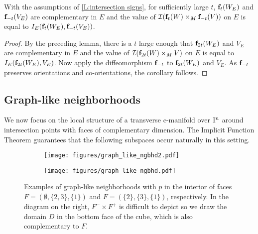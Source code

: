 \begin{corollary}\label{C:intersection signs}
	With the assumptions of \cref{L:intersection signs}, for sufficiently large $t$, $\mathbf{f}_t(W_E)$ and $\mathbf{f}_{-t}(V_E)$ are complementary in $E$ and the value of $\mathcal{I}(\mathbf{f}_t(W) \times_M \mathbf{f}_{-t}(V))$ on $E$ is equal to $I_E(\mathbf{f}_t(W_E), \mathbf{f}_{-t}(V_E))$.
\end{corollary}

\begin{proof}
	By the preceding lemma, there is a $t$ large enough that $\mathbf{f}_{2t}(W_E)$ and $V_E$ are complementary in $E$ and the value of $\mathcal{I}(\mathbf{f}_{2t}(W) \times_M V)$ on $E$ is equal to $I_E(\mathbf{f}_{2t}(W_E), V_E)$.
	Now apply the diffeomorphism $\mathbf{f}_{-t}$ to $\mathbf{f}_{2t}(W_E)$ and $V_E$.
	As $\mathbf{f}_{-t}$ preserves orientations and co-orientations, the corollary follows.
\end{proof}

\subsection{Graph-like neighborhoods}

We now focus on the local structure of a transverse c-manifold over $\mathbb{I}^n$ around intersection points with faces of complementary dimension.
The Implicit Function Theorem guarantees that the following subspaces occur naturally in this setting.

\begin{figure}[!h]
	\centering
	\begin{subfigure}{.32\textwidth}
		\texttt{[image: figures/graph\_like\_ngbhd2.pdf]}
		\hfill
	\end{subfigure}
	\begin{subfigure}{.32\textwidth}
		\hfill
		\texttt{[image: figures/graph\_like\_ngbhd.pdf]}
	\end{subfigure}
	\caption{Examples of graph-like neighborhoods with $p$ in the interior of faces $F=(\emptyset, \{2,3\}, \{1\})$ and $F=(\{2\}, \{3\}, \{1\})$, respectively.
		In the diagram on the right, $F^-\times F^+$ is difficult to depict so we draw the domain $D$ in the bottom face of the cube, which is also complementary to $F$.}
	\label{F:graph like neighborhood}
\end{figure}

